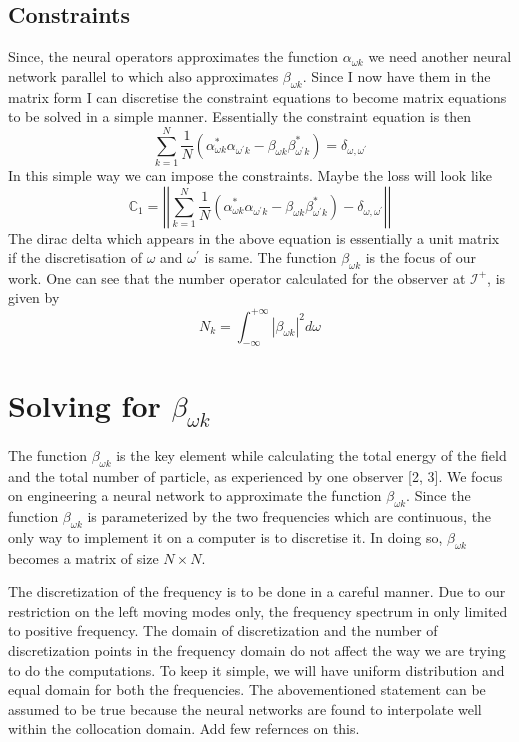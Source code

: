 \subsection{Constraints}
Since, the neural operators approximates the function $\alpha_{\omega k}$ we need another neural network parallel to which also approximates $\beta_{\omega k}$. Since I now have them in the matrix form I can discretise the constraint equations to become matrix equations to be solved in a simple manner. Essentially the constraint equation is then 
\begin{equation}
\sum_{k=1}^{N}\frac{1}{N}(\alpha_{\omega k}^{*}\alpha_{\omega^{\prime}k}-\beta_{\omega k}\beta_{\omega^{\prime}k}^{*})=\delta_{\omega,\omega^{\prime}}
\end{equation}
In this simple way we can impose the constraints. Maybe the loss will look like 
\begin{equation}
\mathbb{C}_{1}=\left|\left|\sum_{k=1}^{N}\frac{1}{N}(\alpha_{\omega k}^{*}\alpha_{\omega^{\prime}k}-\beta_{\omega k}\beta_{\omega^{\prime}k}^{*})-\delta_{\omega,\omega^{\prime}}\right|\right|
\end{equation}
The dirac delta which appears in the above equation is essentially a unit matrix if the discretisation of $\omega$ and $\omega^{\prime}$ is same. The function $\beta_{\omega k}$ is the focus of our work. One can see that the number operator calculated for the observer at $\mathcal{I}^{+}$, is given by 
\begin{equation}
N_{k}=\int_{-\infty}^{+\infty}|\beta_{\omega k}|^{2}d\omega
\end{equation}

\section{Solving for $\beta_{\omega k}$}
The function $\beta_{\omega k}$ is the key element while calculating the total energy of the field and the total number of particle, as experienced by one observer [2, 3]. We focus on engineering a neural network to approximate the function $\beta_{\omega k}$. Since the function $\beta_{\omega k}$ is parameterized by the two frequencies which are continuous, the only way to implement it on a computer is to discretise it. In doing so, $\beta_{\omega k}$ becomes a matrix of size $N\times N$. 

The discretization of the frequency is to be done in a careful manner. Due to our restriction on the left moving modes only, the frequency spectrum in only limited to positive frequency. The domain of discretization and the number of discretization points in the frequency domain do not affect the way we are trying to do the computations. To keep it simple, we will have uniform distribution and equal domain for both the frequencies. The abovementioned statement can be assumed to be true because the neural networks are found to interpolate well within the collocation domain. Add few refernces on this. 

